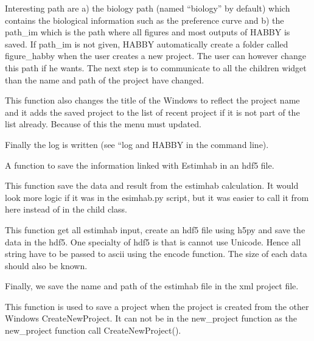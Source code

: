 \documentclass[letterpaper,10pt,english]{sphinxmanual}
\begin{document}
\begin{fulllineitems}
\begin{fulllineitems}
Interesting path are a) the biology path (named ``biology'' by default) which contains the biological information
such as the preference curve and b) the path\_im which is the path where all figures and most outputs of HABBY
is saved. If path\_im is not given, HABBY automatically create a folder called figure\_habby when the
user creates a new project. The user can however change this path if he wants. The next step is to communicate
to all the children widget than the name and path of the project have changed.

This function also changes the title of the Windows to reflect the project name and it adds the saved
project to the list of recent project if it is not part of the list already. Because of this the menu must
updated.

Finally the log is written (see “log and HABBY in the command line).

\end{fulllineitems}


\begin{fulllineitems}
\label{\detokenize{index:src_GUI.Main_windows_1.MainWindows.save_project_estimhab}}
A function to save the information linked with Estimhab in an hdf5 file.


This function save the data and result from the estimhab calculation. It would look more logic if it was in
the esimhab.py script, but it was easier to call it from here instead of in the child class.

This function get all estimhab input, create an hdf5 file using h5py and save the data in the hdf5. One
specialty of hdf5 is that is cannot use Unicode. Hence all string have to be passed to ascii using the encode
function. The size of each data should also be known.

Finally, we save the name and path of the estimhab file in the xml project file.

\end{fulllineitems}


\begin{fulllineitems}
\label{\detokenize{index:src_GUI.Main_windows_1.MainWindows.save_project_if_new_project}}
This function is used to save a project when the project is created from the other Windows CreateNewProject. It
can not be in the new\_project function as the new\_project function call CreateNewProject().


\end{fulllineitems}
\end{fulllineitems}
\end{document}
